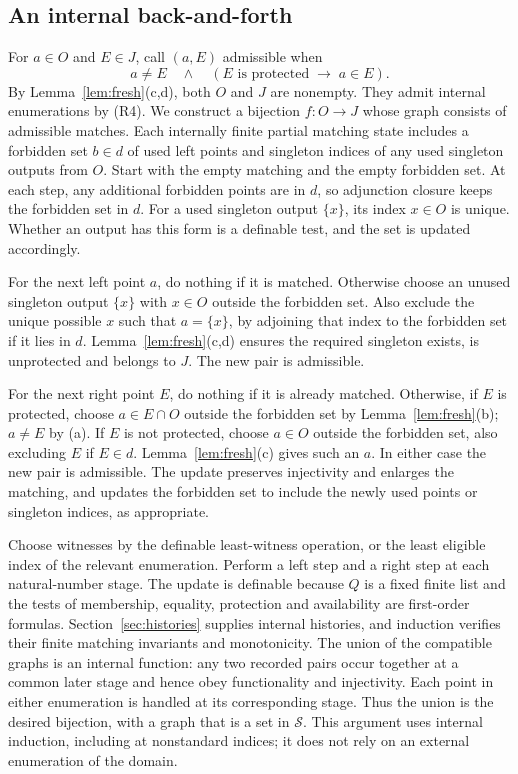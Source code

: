 \documentclass[11pt,a4paper]{article}
\numberwithin{equation}{section}
\theoremstyle{definition}
\theoremstyle{remark}
\begin{document}
\subsection{An internal back-and-forth}\label{sec:matching}
For $a\in O$ and $E\in J$, call $(a,E)$ admissible when
\begin{equation}\label{eq:allowed}
a\ne E\quad\land\quad(E\text{ is protected}\;\to\;a\in E).
\end{equation}
By Lemma~\ref{lem:fresh}(c,d), both $O$ and $J$ are nonempty. They admit internal enumerations by (R4). We construct a bijection $f:O\to J$ whose graph consists of admissible matches. Each internally finite partial matching state includes a forbidden set $b\in d$ of used left points and singleton indices of any used singleton outputs from $O$. Start with the empty matching and the empty forbidden set. At each step, any additional forbidden points are in $d$, so adjunction closure keeps the forbidden set in $d$. For a used singleton output $\{x\}$, its index $x\in O$ is unique. Whether an output has this form is a definable test, and the set is updated accordingly.

For the next left point $a$, do nothing if it is matched. Otherwise choose an unused singleton output $\{x\}$ with $x\in O$ outside the forbidden set. Also exclude the unique possible $x$ such that $a=\{x\}$, by adjoining that index to the forbidden set if it lies in $d$. Lemma~\ref{lem:fresh}(c,d) ensures the required singleton exists, is unprotected and belongs to $J$. The new pair is admissible.

For the next right point $E$, do nothing if it is already matched. Otherwise, if $E$ is protected, choose $a\in E\cap O$ outside the forbidden set by Lemma~\ref{lem:fresh}(b); $a\ne E$ by (a). If $E$ is not protected, choose $a\in O$ outside the forbidden set, also excluding $E$ if $E\in d$. Lemma~\ref{lem:fresh}(c) gives such an $a$. In either case the new pair is admissible. The update preserves injectivity and enlarges the matching, and updates the forbidden set to include the newly used points or singleton indices, as appropriate.

Choose witnesses by the definable least-witness operation, or the least eligible index of the relevant enumeration. Perform a left step and a right step at each natural-number stage. The update is definable because $Q$ is a fixed finite list and the tests of membership, equality, protection and availability are first-order formulas. Section~\ref{sec:histories} supplies internal histories, and induction verifies their finite matching invariants and monotonicity. The union of the compatible graphs is an internal function: any two recorded pairs occur together at a common later stage and hence obey functionality and injectivity. Each point in either enumeration is handled at its corresponding stage. Thus the union is the desired bijection, with a graph that is a set in $\mathcal S$. This argument uses internal induction, including at nonstandard indices; it does not rely on an external enumeration of the domain.
\end{document}
